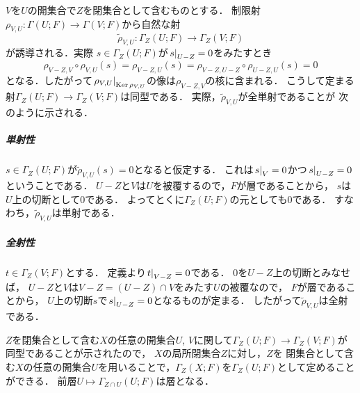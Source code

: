 \(V\)を\(U\)の開集合で\(Z\)を閉集合として含むものとする．
制限射\(
    \rho_{V,U}\colon\Gamma(U;F)\to\Gamma(V;F)
\)から自然な射\[
    \widetilde{\rho}_{V,U}\colon
    \Gamma_Z(U;F)\to\Gamma_Z(V;F)
\]が誘導される．実際
\(s\in\Gamma_Z(U;F)\)が\(\mres[s]{U-Z}=0\)をみたすとき
\[
    \rho_{V-Z,V}\circ\rho_{V,U}(s)
    =\rho_{V-Z,U}(s)
    =\rho_{V-Z,U-Z}\circ\rho_{U-Z,U}(s)
    =0
\]となる．したがって\(
    \mres[\rho_{V,U}]{\Ker\rho_{V,U}}
\)の像は\(\rho_{V-Z,V}\)の核に含まれる．
こうして定まる射\(\Gamma_Z(U;F)\to\Gamma_Z(V;F)\)は同型である．
実際，\(\widetilde{\rho}_{V,U}\)が全単射であることが
次のように示される．
\subparagraph*{単射性}
\(s\in\Gamma_Z(U;F)\)が\(
    \widetilde{\rho}_{V,U}(s)=0
\)となると仮定する．
これは\(\mres[s]{V}=0\)かつ\(\mres[s]{U-Z}=0\)ということである．
\(U-Z\)と\(V\)は\(U\)を被覆するので，\(F\)が層であることから，
\(s\)は\(U\)上の切断として\(0\)である．
よってとくに\(\Gamma_Z(U;F)\)の元としても\(0\)である．
すなわち，\(\widetilde{\rho}_{V,U}\)は単射である．
\subparagraph*{全射性}
\(t\in\Gamma_Z(V;F)\)とする．
定義より\(\mres[t]{V-Z}=0\)である．
\(0\)を\(U-Z\)上の切断とみなせば，
\(U-Z\)と\(V\)は\(V-Z=(U-Z)\cap V\)をみたす\(U\)の被覆なので，
\(F\)が層であることから，
\(U\)上の切断\(s\)で\(\mres[s]{U-Z}=0\)となるものが定まる．
したがって\(\widetilde{\rho}_{V,U}\)は全射である．

\(Z\)を閉集合として含む\(X\)の任意の開集合\(U\), \(V\)に関して\(
    \Gamma_Z(U;F)\to\Gamma_Z(V;F)
\)が同型であることが示されたので，
\(X\)の局所閉集合\(Z\)に対し，\(Z\)を
閉集合として含む\(X\)の任意の開集合\(U\)を用いることで，\(
    \Gamma_Z(X;F)
\)を\(\Gamma_Z(U;F)\)として定めることができる．
前層\(U\mapsto\Gamma_{Z\cap U}(U;F)\)は層となる．

